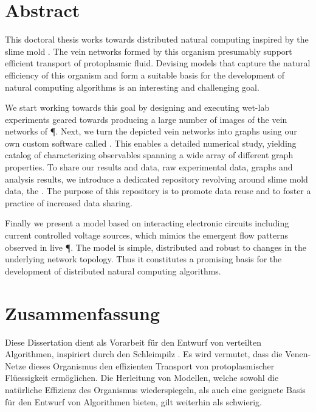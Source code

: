 \null\vfill

\section*{Abstract}
	
	This doctoral thesis works towards distributed natural computing inspired by the slime mold \Pp. The vein networks formed by this organism presumably support efficient transport of protoplasmic fluid. Devising models that capture the natural efficiency of this organism and form a suitable basis for the development of natural computing algorithms is an interesting and challenging goal.
	
	We start working towards this goal by designing and executing wet-lab experiments geared towards producing a large number of images of the vein networks of \P. Next, we turn the depicted vein networks into graphs using our own custom software called \NEFI. This enables a detailed numerical study, yielding catalog of characterizing observables spanning a wide array of different graph properties. To share our results and data, \ie raw experimental data, graphs and analysis results, we introduce a dedicated repository revolving around slime mold data, the \SMGR. The purpose of this repository is to promote data reuse and to foster a practice of increased data sharing. 

	Finally we present a model based on interacting electronic circuits including current controlled voltage sources, which mimics the emergent flow patterns observed in live \P. The model is simple, distributed and robust to changes in the underlying network topology. Thus it constitutes a promising basis for the development of distributed natural computing algorithms.

\vfill

\section*{Zusammenfassung}

	Diese Dissertation dient als Vorarbeit f\"ur den Entwurf von verteilten Algorithmen, inspiriert durch den Schleimpilz \Pp. Es wird vermutet, dass die Venen-Netze dieses Organismus den effizienten Transport von protoplasmischer Fl\"uessigkeit erm\"oglichen. Die Herleitung von Modellen, welche sowohl die nat\"urliche Effizienz des Organismus wiederspiegeln, als auch eine geeignete Basis f\"ur den Entwurf von Algorithmen bieten, gilt weiterhin als schwierig.

